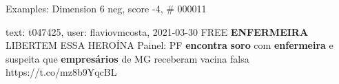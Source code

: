 \begin{frame}{Examples: Dimension 6 neg, score -4, \# 000011}
\footnotesize
\begin{alertblock}{text: t047425, user: flaviovmcosta, 2021-03-30}
FREE \textbf{ENFERMEIRA} LIBERTEM ESSA HEROÍNA Painel: PF \textbf{encontra} 
\textbf{soro} com \textbf{enfermeira} e suspeita que \textbf{empresários} de MG 
receberam vacina falsa https://t.co/mz8b9YqcBL 
\end{alertblock}
\end{frame}
